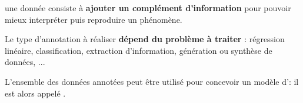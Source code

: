 	\begin{leftBarSummary}
		\begin{todolist}
			\item[\itemok]  une donnée consiste à \textbf{ajouter un complément d'information} pour pouvoir mieux interpréter puis reproduire un phénomène.
			\item[\itemok] Le type d'annotation à réaliser \textbf{dépend du problème à traiter} : régression linéaire, classification, extraction d'information, génération ou synthèse de données, ...
			\item[\itemok] L'ensemble des données annotées peut être utilisé pour concevoir un modèle d': il est alors appelé .
		\end{todolist}
	\end{leftBarSummary}